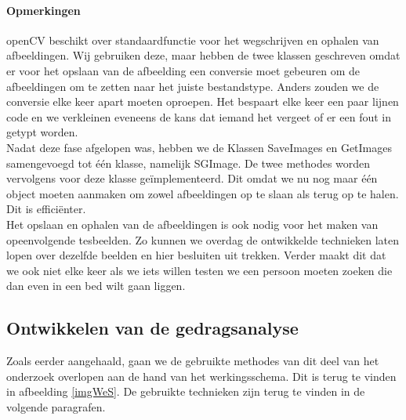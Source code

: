 \paragraph{Opmerkingen}
openCV beschikt over standaardfunctie voor het wegschrijven en ophalen van afbeeldingen. Wij gebruiken deze, maar hebben de twee klassen geschreven omdat er voor het opslaan van de afbeelding een conversie moet gebeuren om de afbeeldingen om te zetten naar het juiste bestandstype. Anders zouden we de conversie elke keer apart moeten oproepen. Het bespaart elke keer een paar lijnen code en we verkleinen eveneens de kans dat iemand het vergeet of er een fout in getypt worden.\\
Nadat deze fase afgelopen was, hebben we de Klassen SaveImages en GetImages samengevoegd tot \'e\'en klasse, namelijk SGImage. De twee methodes worden vervolgens voor deze klasse ge\"implementeerd. Dit omdat we nu nog maar \'e\'en object moeten aanmaken om zowel afbeeldingen op te slaan als terug op te halen. Dit is effici\"enter. \\
Het opslaan en ophalen van de afbeeldingen is ook nodig voor het maken van opeenvolgende tesbeelden. Zo kunnen we overdag de ontwikkelde technieken laten lopen over dezelfde beelden en hier besluiten uit trekken. Verder maakt dit dat we ook niet elke keer als we iets willen testen we een persoon moeten zoeken die dan even in een bed wilt gaan liggen.

\subsection{Ontwikkelen van de gedragsanalyse}
\label{mRefOGA}
Zoals eerder aangehaald, gaan we de gebruikte methodes van dit deel van het onderzoek overlopen aan de hand van het werkingsschema. Dit is terug te vinden in afbeelding \ref{imgWeS}. De gebruikte technieken zijn terug te vinden in de volgende paragrafen.

